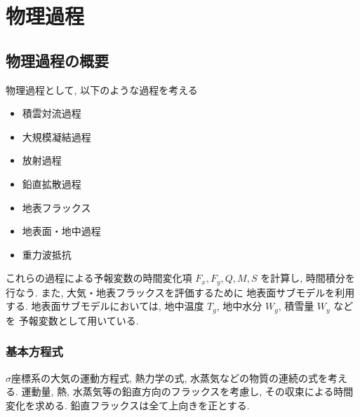 ﻿
\section{物理過程}

\subsection{物理過程の概要}

物理過程として, 以下のような過程を考える
\begin{itemize}
\item 積雲対流過程
\item 大規模凝結過程
\item 放射過程
\item 鉛直拡散過程
\item 地表フラックス
\item 地表面・地中過程
\item 重力波抵抗
\end{itemize}
これらの過程による予報変数の時間変化項
$F_x, F_y, Q, M, S$ を計算し, 時間積分を行なう.
また, 大気・地表フラックスを評価するために
地表面サブモデルを利用する.
地表面サブモデルにおいては,
地中温度 $T_g$, 地中水分 $W_g$, 積雪量 $W_y$ などを
予報変数として用いている.


\subsubsection{基本方程式}

$\sigma$座標系の大気の運動方程式, 熱力学の式,
水蒸気などの物質の連続の式を考える.
運動量, 熱, 水蒸気等の鉛直方向のフラックスを考慮し,
その収束による時間変化を求める.
鉛直フラックスは全て上向きを正とする.

